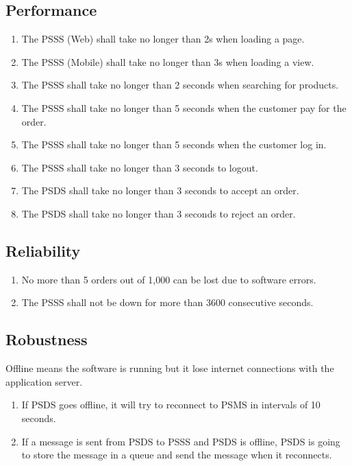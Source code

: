 \subsection{Performance}
\begin{enumerate}[label=PER-\arabic*]
    \item The PSSS (Web) shall take no longer than 2s when loading a page.
    \item The PSSS (Mobile) shall take no longer than 3s when loading a view. 
    \item The PSSS shall take no longer than 2 seconds when searching for 
    products.
    \item The PSSS shall take no longer than 5 seconds when the customer 
    pay for the order.
    \item The PSSS shall take no longer than 5 seconds when the customer 
    log in.
    \item The PSSS shall take no longer than 3 seconds to logout.
    \item The PSDS shall take no longer than 3 seconds to accept an order.
    \item The PSDS shall take no longer than 3 seconds to reject an order.
\end{enumerate}

\subsection{Reliability}
\begin{enumerate}[label=REL-\arabic*]
    \item No more than 5 orders out of 1,000 can be lost due to software errors.
    \item The PSSS shall not be down for more than 3600 consecutive seconds.
\end{enumerate}
\subsection{Robustness}
Offline means the software is running but it lose internet connections 
with the application server.

\begin{enumerate}[label=ROB-\arabic*]
    \item If PSDS goes offline, it will try to reconnect to PSMS in 
    intervals of 10 seconds.
    \item If a message is sent from PSDS to PSSS and PSDS is offline, PSDS is 
    going to store the message in a queue and send the message 
    when it reconnects.
\end{enumerate}

